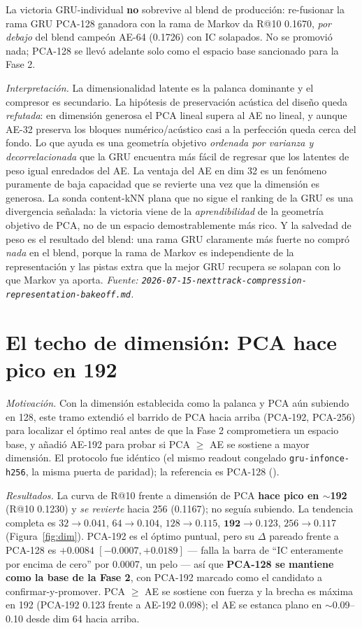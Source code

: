 \documentclass[11pt]{article}
\newcommand{\runid}[1]{\texttt{\small\seqsplit{#1}}}
\begin{document}
La victoria GRU-individual \textbf{no} sobrevive al blend de producción:
re-fusionar la rama GRU PCA-128 ganadora con la rama de Markov da R@10
\num{0.1670}, \emph{por debajo} del blend campeón AE-64 (\num{0.1726}) con IC
solapados. No se promovió nada; PCA-128 se llevó adelante solo como el espacio
base sancionado para la Fase 2.

\emph{Interpretación.} La dimensionalidad latente es la palanca dominante y el
compresor es secundario. La hipótesis de preservación acústica del diseño queda
\emph{refutada}: en dimensión generosa el PCA lineal supera al AE no lineal, y
aunque AE-32 preserva los bloques numérico/acústico casi a la perfección queda
cerca del fondo. Lo que ayuda es una geometría objetivo \emph{ordenada por
varianza y decorrelacionada} que la GRU encuentra más fácil de regresar que los
latentes de peso igual enredados del AE. La ventaja del AE en dim 32 es un
fenómeno puramente de baja capacidad que se revierte una vez que la dimensión es
generosa. La sonda content-kNN plana que no sigue el ranking de la GRU es una
divergencia señalada: la victoria viene de la \emph{aprendibilidad} de la
geometría objetivo de PCA, no de un espacio demostrablemente más rico. Y la
salvedad de peso es el resultado del blend: una rama GRU claramente más fuerte
no compró \emph{nada} en el blend, porque la rama de Markov es independiente de
la representación y las pistas extra que la mejor GRU recupera se solapan con lo
que Markov ya aporta.
\emph{Fuente:
\texttt{2026-07-15-nexttrack-compression-representation-bakeoff.md}.}

\section{El techo de dimensión: PCA hace pico en 192}
\label{sec:dim}
\emph{Motivación.} Con la dimensión establecida como la palanca y PCA aún
subiendo en 128, este tramo extendió el barrido de PCA hacia arriba (PCA-192,
PCA-256) para localizar el óptimo real antes de que la Fase 2 comprometiera un
espacio base, y añadió AE-192 para probar si PCA $\ge$ AE se sostiene a mayor
dimensión. El protocolo fue idéntico (el mismo readout congelado
\texttt{gru-infonce-h256}, la misma puerta de paridad); la referencia es PCA-128
(\runid{run-20260715-042100-a1d9d}).

\emph{Resultados.} La curva de R@10 frente a dimensión de PCA \textbf{hace pico
en $\sim$192} (R@10 \num{0.1230}) y \emph{se revierte} hacia 256 (\num{0.1167});
no seguía subiendo. La tendencia completa es $32\!\to\!\num{0.041}$,
$64\!\to\!\num{0.104}$, $128\!\to\!\num{0.115}$, $\mathbf{192\!\to\!\num{0.123}}$,
$256\!\to\!\num{0.117}$ (Figura~\ref{fig:dim}). PCA-192 es el óptimo puntual,
pero su $\Delta$ pareado frente a PCA-128 es $+\num{0.0084}$ $[-0.0007, +0.0189]$
--- falla la barra de ``IC enteramente por encima de cero'' por \num{0.0007}, un
pelo --- así que \textbf{PCA-128 se mantiene como la base de la Fase 2}, con
PCA-192 marcado como el candidato a confirmar-y-promover. PCA $\ge$ AE se
sostiene con fuerza y la brecha es máxima en 192 (PCA-192 \num{0.123} frente a
AE-192 \num{0.098}); el AE se estanca plano en $\sim$0.09--0.10 desde dim 64
hacia arriba.
\end{document}
